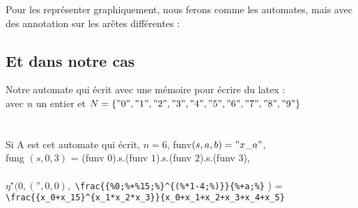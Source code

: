 \documentclass{article}
\theoremstyle{definition}
\begin{document}
Pour les représenter graphiquement, nous ferons comme les automates, mais avec des annotation sur les arêtes différentes :\\
\subsection{Et dans notre cas}
Notre automate qui écrit avec une mémoire pour \'ecrire du latex :\\ 
avec $n$ un entier et $N = \{"0","1","2","3","4","5","6","7","8","9"\}$\\
\resizebox{\textwidth}{!}{} \\\\
Si A est cet automate qui écrit, $n = 6$, funv$(s,a,b) = "x\_a"$,\\ fung $(s,0,3)$ = (funv  $0$).s.(funv $1$).s.(funv $2$).s.(funv $3$),\\\\
$\eta^\star (0,(\text{''},0,0),$ 
\verb|\frac{{%|\textbar\verb|0;%+%|\textbar\verb|15;%}^{(%*|\textbar\verb|1-4;%)}}{%+|\textbar\verb|a;%}| ) =\\
\verb|\frac{{x_0+x_15}^{x_1*x_2*x_3}}{x_0+x_1+x_2+x_3+x_4+x_5}|
\end{document}
